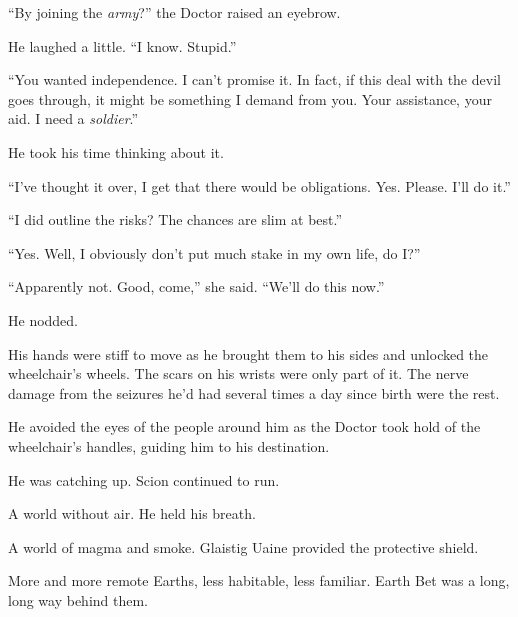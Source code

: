 ``By joining the \emph{army}?'' the Doctor raised an eyebrow.



He laughed a little.  ``I know.  Stupid.''



``You wanted independence.  I can't promise it.  In fact, if this deal with the devil goes through, it might be something I demand from you.  Your assistance, your aid.  I need a \emph{soldier}.''



He took his time thinking about it.



``I've thought it over, I get that there would be obligations.  Yes.  Please.  I'll do it.''



``I did outline the risks?  The chances are slim at best.''



``Yes.  Well, I obviously don't put much stake in my own life, do I?''



``Apparently not.  Good, come,'' she said.  ``We'll do this now.''



He nodded.



His hands were stiff to move as he brought them to his sides and unlocked the wheelchair's wheels.  The scars on his wrists were only part of it.  The nerve damage from the seizures he'd had several times a day since birth were the rest.



He avoided the eyes of the people around him as the Doctor took hold of the wheelchair's handles, guiding him to his destination.



\blacksquare






He was catching up.  Scion continued to run.



A world without air.  He held his breath.



A world of magma and smoke.  Glaistig Uaine provided the protective shield.



More and more remote Earths, less habitable, less familiar.  Earth Bet was a long, long way behind them.



